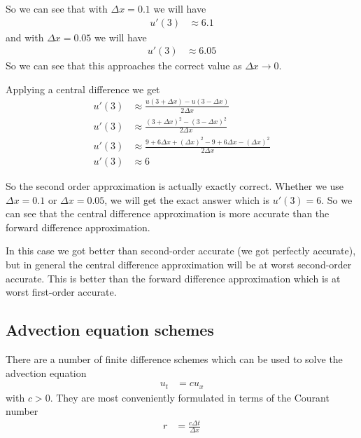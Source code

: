 \documentclass[twocolumn]{myarticle}
\begin{document}
So we can see that with $ \Delta x = 0.1 $ we will have
\begin{align}
    u'(3) &\approx 6.1
\end{align}
and with $ \Delta x = 0.05 $ we will have
\begin{align}
    u'(3) &\approx 6.05
\end{align}
So we can see that this approaches the correct value as $ \Delta x \to 0 $.

Applying a central difference we get
\begin{align}
    u'(3) &\approx \frac{u(3 + \Delta x) - u(3 - \Delta x)}{2 \Delta x}
    \\
    u'(3) &\approx \frac{(3 + \Delta x)^2 - (3 - \Delta x)^2}{2 \Delta x}
    \\
    u'(3) &\approx \frac{9 + 6 \Delta x + (\Delta x)^2 - 9 + 6 \Delta x - (\Delta x)^2 }{2 \Delta x}
    \\
    u'(3) &\approx 6
\end{align}

So the second order approximation is actually exactly correct.
Whether we use $ \Delta x = 0.1 $ or $ \Delta x = 0.05 $, we will get the exact answer which is $ u'(3) = 6 $.
So we can see that the central difference approximation is more accurate than the forward difference approximation.

In this case we got better than second-order accurate (we got perfectly accurate), but in general the central difference approximation will be at worst second-order accurate.
This is better than the forward difference approximation which is at worst first-order accurate.

\subsection{Advection equation schemes}
\label{subsec:advection_equation_schemes}

There are a number of finite difference schemes which can be used to solve the advection equation
\begin{align}
    u_t &= c u_x
\end{align}
with $ c > 0 $.
They are most conveniently formulated in terms of the Courant number
\begin{align}
    r &= \frac{c \Delta t}{\Delta x}
\end{align}
\end{document}
